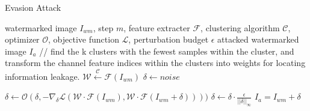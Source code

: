 \begin{algorithm}[tb]
   \caption{Evasion Attack}
   \label{alg:evasion algo}
\begin{algorithmic}
    watermarked image $I_{wm}$, step $m$, feature extracter $\mathcal{F}$, clustering algorithm $\mathcal{C}$, optimizer $\mathcal{O}$, objective function $\mathcal{L}$, perturbation budget $\epsilon$
    attacked watermarked image $I_a$
   \STATE // find the k clusters with the fewest samples within the cluster, and transform the channel feature indices within the clusters into weights for locating information leakage.
   \STATE $\mathcal{W} \xleftarrow{\mathcal{C}} \mathcal{F}(I_{wm})$ 
   \STATE $\delta \xleftarrow{} noise$
   
   \STATE $\delta \xleftarrow{} \mathcal{O}(\delta,-\nabla_\delta\mathcal{L}(\mathcal{W} \cdot \mathcal{F}(I_{wm}), \mathcal{W}\cdot \mathcal{F}(I_{wm} + \delta))))$
   \IF{$||\delta||_\infty > \epsilon$}
   \STATE  $\delta \xleftarrow{} \delta \cdot \frac{\epsilon}{||\delta||_\infty}$
   \ENDIF
   \ENDFOR
    $I_a = I_{wm} + \delta$
\end{algorithmic}
\end{algorithm}

